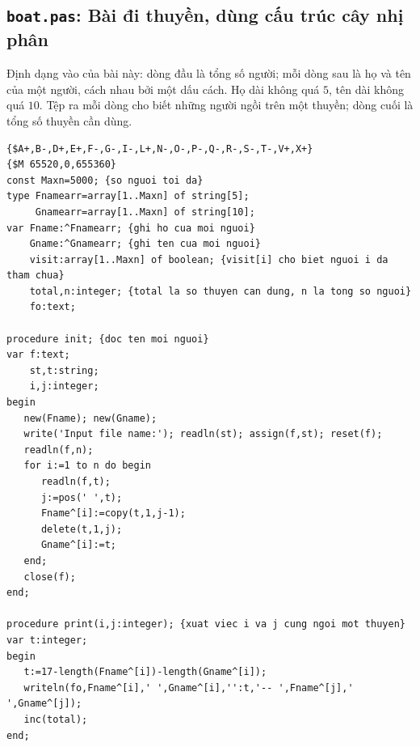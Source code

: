 \documentclass[11pt]{article}
\begin{document}
\subsection{\texttt{boat.pas}: Bài đi thuyền, dùng cấu trúc cây nhị phân}

Định dạng vào của bài này: dòng đầu là tổng số người; mỗi dòng sau là họ và
tên của một người, cách nhau bởi một dấu cách. Họ dài không quá \(5\), tên
dài không quá \(10\). Tệp ra mỗi dòng cho biết những người ngồi trên một
thuyền; dòng cuối là tổng số thuyền cần dùng.

\begin{verbatim}
{$A+,B-,D+,E+,F-,G-,I-,L+,N-,O-,P-,Q-,R-,S-,T-,V+,X+}
{$M 65520,0,655360}
const Maxn=5000; {so nguoi toi da}
type Fnamearr=array[1..Maxn] of string[5];
     Gnamearr=array[1..Maxn] of string[10];
var Fname:^Fnamearr; {ghi ho cua moi nguoi}
    Gname:^Gnamearr; {ghi ten cua moi nguoi}
    visit:array[1..Maxn] of boolean; {visit[i] cho biet nguoi i da tham chua}
    total,n:integer; {total la so thuyen can dung, n la tong so nguoi}
    fo:text;

procedure init; {doc ten moi nguoi}
var f:text;
    st,t:string;
    i,j:integer;
begin
   new(Fname); new(Gname);
   write('Input file name:'); readln(st); assign(f,st); reset(f);
   readln(f,n);
   for i:=1 to n do begin
      readln(f,t);
      j:=pos(' ',t);
      Fname^[i]:=copy(t,1,j-1);
      delete(t,1,j);
      Gname^[i]:=t;
   end;
   close(f);
end;

procedure print(i,j:integer); {xuat viec i va j cung ngoi mot thuyen}
var t:integer;
begin
   t:=17-length(Fname^[i])-length(Gname^[i]);
   writeln(fo,Fname^[i],' ',Gname^[i],'':t,'-- ',Fname^[j],' ',Gname^[j]);
   inc(total);
end;


\end{verbatim}
\end{document}
